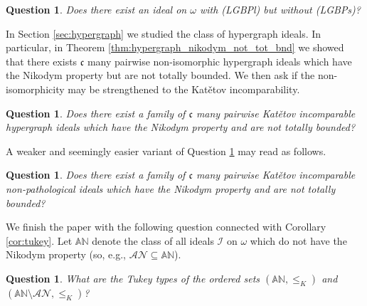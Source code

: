 \documentclass[a4paper,11pt,fleqn]{amsart}
\newtheorem{question}[theorem]{Question}
\theoremstyle{definition}
\theoremstyle{remark}
\numberwithin{equation}{section}
\newcommand{\frakc}{\mathfrak{c}}
\newcommand{\F}{\mathbb{F}}
\newcommand{\iI}{\mathcal{I}}
\newcommand{\sm}{\setminus}
\newcommand{\sub}{\subseteq}
\begin{document}
\begin{question}
    Does there exist an ideal on $\omega$ with (LGBPl) but without (LGBPs)?
\end{question}

In Section \ref{sec:hypergraph} we studied the class of hypergraph ideals. In particular, in Theorem \ref{thm:hypergraph_nikodym_not_tot_bnd} we showed that there exists $\frakc$ many pairwise non-isomorphic hypergraph ideals which have the Nikodym property but are not totally bounded. We then ask if the non-isomorphicity may be strengthened to the Kat\v{e}tov incomparability.

\begin{question}\label{ques:incomp_hypergraph}
Does there exist a family of $\frakc$ many pairwise Kat\v{e}tov incomparable hypergraph ideals which have the Nikodym property and are not totally bounded?   
\end{question}

A weaker and seemingly easier variant of Question \ref{ques:incomp_hypergraph} may read as follows.

\begin{question}
Does there exist a family of $\frakc$ many pairwise Kat\v{e}tov incomparable non-pathological ideals which have the Nikodym property and are not totally bounded?   
\end{question}

We finish the paper with the following question connected with Corollary \ref{cor:tukey}. Let $\mathbb{AN}$ denote the class of all ideals $\iI$ on $\omega$ which do not have the Nikodym property (so, e.g., $\mathcal{AN}\sub\mathbb{AN}$).

\begin{question}
What are the Tukey types of the ordered sets $(\mathbb{AN},\le_K)$ and $(\mathbb{AN}\sm\mathcal{AN},\le_K)$?
\end{question}

\end{document}
